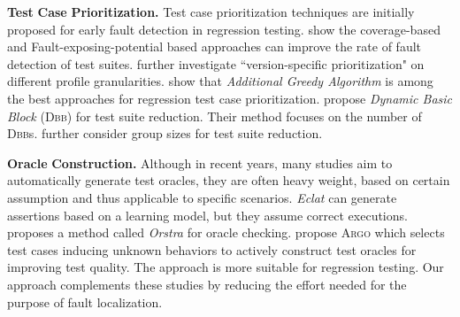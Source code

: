 



\smallskip\noindent
\textbf{Test} \textbf{Case} \textbf{Prioritization.}
Test case prioritization techniques are initially proposed for early fault detection in regression testing. \cite{RUCH01} show the coverage-based and Fault-exposing-potential based approaches can improve the rate of fault detection of test suites. \cite{SEAGMGR01} further investigate ``version-specific prioritization" on different profile granularities. \citep{LHH07} show that {\em Additional Greedy Algorithm} is among the best approaches for regression test case prioritization.
\cite{DBLP:conf/icse/BaudryFT06} propose {\em Dynamic Basic Block} (\textsc{Dbb}) for test suite reduction. Their method focuses on the number of \textsc{Dbb}s.
\cite{Alberto2011} further consider group sizes for test suite reduction.


\smallskip\noindent
\textbf{Oracle} \textbf{Construction.}
Although in recent years, many studies \cite[e.g.][]{CPacheco05,Xie06,BRH04} aim to automatically generate test oracles, they are often heavy weight, based on certain assumption and thus applicable to specific scenarios. {\em Eclat} \citep{CPacheco05} can generate assertions based on a learning model, but they assume correct executions.
\cite{Xie06} proposes a method called {\em Orstra} for oracle checking.
\cite{BRH04} propose \textsc{Argo} which selects test cases inducing unknown behaviors to actively construct test oracles for improving test quality. The approach is more suitable for regression testing. Our approach complements these studies by reducing the effort needed for the purpose of fault localization.

